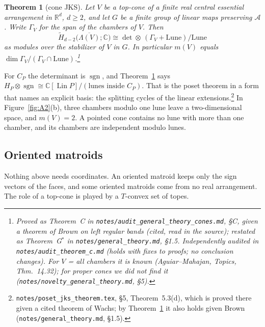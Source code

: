 \documentclass[11pt]{article}
\newtheorem{theorem}{Theorem}
\theoremstyle{definition}
\theoremstyle{remark}
\newcommand{\Lin}{\operatorname{Lin}}
\newcommand{\sgn}{\operatorname{sgn}}
\newcommand{\Lune}{\mathrm{Lune}}
\newcommand{\src}[1]{\nolinkurl{#1}}
\newcommand{\tagbox}[1]{\leavevmode\marginpar{\raggedright\fbox{\parbox{0.66in}{\centering\scriptsize\sffamily #1}}}}
\newcommand{\PROVEN}{\tagbox{PROVEN\\AUDITED}}
\begin{document}
\medskip
\noindent{}

\begin{theorem}[cone JKS]\label{thm:G}\PROVEN
Let $V$ be a top-cone of a finite real central essential arrangement in
$\mathbb R^d$, $d\ge2$, and let $G$ be a finite group of linear maps
preserving $\mathcal A$. Write $\Gamma_V$ for the span of the chambers of $V$.
Then
\[
\widetilde H_{d-2}\bigl(\overline{\Lambda(V)};\mathbb C\bigr)\cong
\det\otimes\,(\Gamma_V+\Lune)/\Lune
\]
as modules over the stabilizer of $V$ in $G$. In particular $m(V)$ equals
$\dim\Gamma_V/(\Gamma_V\cap\Lune)$.\footnote{Proved as Theorem~C in
\src{notes/audit_general_theory_cones.md}, \S C, given a theorem of Brown on
left regular bands (cited, read in the source); restated as Theorem~G$^*$
in \src{notes/general_theory.md}, \S1.5. Independently audited in
\src{notes/audit_theorem_c.md} (holds with fixes to proofs; no conclusion
changes). For $V$ = all chambers it is known (Aguiar--Mahajan, \emph{Topics},
Thm.~14.32); for proper cones we did not find it
(\src{notes/novelty_general_theory.md}, \S5).}
\end{theorem}

For $C_P$ the determinant is $\sgn$, and Theorem~\ref{thm:G} says
$H_P\otimes\sgn\cong\mathbb C[\Lin P]/(\text{lunes inside }C_P)$. That is the
poset theorem in a form that names an explicit basis: the splitting cycles of
the linear extensions.\footnote{\src{notes/poset_jks_theorem.tex}, \S5,
Theorem~5.3(d), which is proved there given a cited theorem of Wachs; by
Theorem~\ref{thm:G} it also holds given Brown
(\src{notes/general_theory.md}, \S1.5).}
In Figure~\ref{fig:A2}(b), three chambers modulo one lune leave a
two-dimensional space, and $m(V)=2$. A pointed cone contains no lune with
more than one chamber, and its chambers are independent modulo lunes.

\subsection{Oriented matroids}

Nothing above needs coordinates. An oriented matroid keeps only the sign
vectors of the faces, and some oriented matroids come from no real
arrangement. The role of a top-cone is played by a $T$-convex set of topes.
\end{document}
